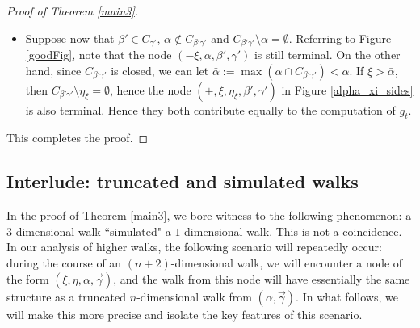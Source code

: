 \documentclass{amsart}
\numberwithin{theorem}{section}
\theoremstyle{definition}
\renewcommand{\subset}{\subseteq}
\newcommand{\acc}{\mathrm{acc}}
\begin{document}
\begin{proof}[Proof of Theorem \ref{main3}]
\begin{itemize}
\begin{itemize}
\begin{figure}[ht]
\caption{If $\xi>\bar\alpha$, then $\eta_\xi\not\in C_{\beta'\gamma'}$ and $\min(C_{\beta'\gamma'}\setminus \eta_\xi)=\alpha$.}
\label{bad_node_not_acc}
\end{figure}
Comparing with Figure \ref{good_step}, we see that the cones underneath $(\pm,\xi,\alpha,\beta',\gamma')$ cancel out. We now claim that the node $(+,\xi,\eta_\xi,\alpha,\gamma')$ is always terminal (for sufficiently large $\xi$). Indeed, if $\alpha\in\acc(C_{\gamma'})$, then by coherence $C_\alpha=C_{\alpha\gamma'}$, so in particular $\eta_\xi\in C_{\alpha\gamma'}$ and $C_{\eta_\xi\alpha\gamma'}\subset\xi=C_\alpha\cap [\xi,\eta_\xi)=\emptyset$. If instead $\alpha\not\in\acc(C_{\gamma'})$, set $\alpha^*=\max(\alpha\cap C_{\gamma'})$. Then, if $\xi>\alpha^*$, it follows that $\eta_\xi\not\in C_{\gamma'}$ and therefore $C_{\alpha\gamma'}\setminus \eta_\xi \subset C_{\gamma'}\cap[\eta_\xi,\alpha)=\emptyset$. As for the node $(-,\xi,\eta_\xi,\alpha,\beta')$, this was already analysed before, see Figure \ref{1dstep} and the surrounding discussion.

The upshot now is that, for large enough $\xi$, the values of $g_t(\xi)$ are constant, for we have two cancelling cones plus a constant tree stemming from the simulated one-dimensional walk, as in Figure \ref{1dstep}.
\end{itemize}
\item Suppose now that $\beta'\in C_{\gamma'}$, $\alpha\not\in C_{\beta'\gamma'}$ and $C_{\beta'\gamma'}\setminus\alpha=\emptyset$. Referring to Figure \ref{goodFig}, note that the node $(-\xi,\alpha,\beta',\gamma')$ is still terminal. On the other hand, since $C_{\beta'\gamma'}$ is closed, we can let $\bar\alpha:=\max(\alpha\cap C_{\beta'\gamma'})<\alpha$. If $\xi>\bar\alpha$, then $C_{\beta'\gamma'}\setminus\eta_\xi=\emptyset$, hence the node $(+,\xi,\eta_\xi,\beta',\gamma')$ in Figure \ref{alpha_xi_sides} is also terminal. Hence they both contribute equally to the computation of $g_t$.
\end{itemize}
This completes the proof.
\end{proof}

\subsection{Interlude: truncated and simulated walks}


In the proof of Theorem \ref{main3}, we bore witness to the following phenomenon: a $3$-dimensional walk ``simulated" a $1$-dimensional walk. This is not a coincidence. In our analysis of higher walks, the following scenario will repeatedly occur: 
during the course of an $(n+2)$-dimensional walk, we will encounter a node of 
the form $(\xi,\eta,\alpha,\vec{\gamma})$, and the walk from this node will 
have essentially the same structure as a truncated $n$-dimensional walk from 
$(\alpha,\vec{\gamma})$. In what follows, we will make this more precise and 
isolate the key features of this scenario.
\end{document}
